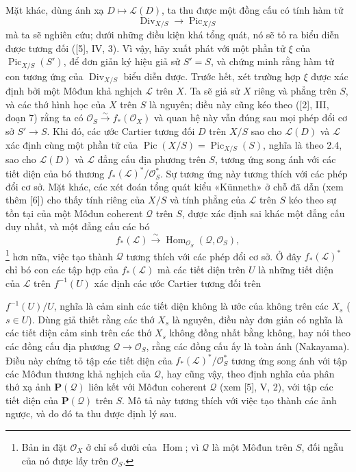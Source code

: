 \documentclass[11pt,twoside,openany]{book}
\numberwithin{equation}{section}
\newcommand{\src}[1]{%
  \phantomsection\hypertarget{src:\fgasourceid:#1}{}%
  \marginpar{\raggedleft\footnotesize\sffamily #1}%
}
\newcommand{\fgasourceid}{unset}
\begin{document}
Mặt khác, dùng ánh xạ $D\longmapsto\mathcal L(D)$, ta thu được một đồng cấu có
tính hàm tử
\begin{equation}
\operatorname{Div}_{X/S}\longrightarrow\operatorname{Pic}_{X/S}
\tag{+}
\end{equation}
mà ta sẽ nghiên cứu; dưới những điều kiện khá tổng quát, nó sẽ tỏ ra biểu diễn
được tương đối ([5], IV, 3). Vì vậy, hãy xuất phát với một phần tử $\xi$ của
$\operatorname{Pic}_{X/S}(S')$, để đơn giản ký hiệu giả sử $S'=S$, và chứng
minh rằng hàm tử con tương ứng của $\operatorname{Div}_{X/S}$ biểu diễn được.
Trước hết, xét trường hợp $\xi$ được xác định bởi một Môđun khả nghịch
$\mathcal L$ trên $X$. Ta sẽ giả sử $X$ riêng và phẳng trên $S$, và các thớ
hình học của $X$ trên $S$ là nguyên; điều này cũng kéo theo ([2], III, đoạn 7)
rằng ta có $\mathcal O_S\xrightarrow{\sim}f_*(\mathcal O_X)$ và quan hệ này
vẫn đúng sau mọi phép đổi cơ sở $S'\longrightarrow S$. Khi đó, các ước Cartier
tương đối $D$ trên $X/S$ sao cho $\mathcal L(D)$ và $\mathcal L$ xác định cùng
một phần tử của $\operatorname{Pic}(X/S)=\operatorname{Pic}_{X/S}(S)$, nghĩa
là theo 2.4, sao cho $\mathcal L(D)$ và $\mathcal L$ đẳng cấu địa phương trên
$S$, tương ứng song ánh với các tiết diện của bó thương
$f_*(\mathcal L)^*/\mathcal O_S^*$. Sự tương ứng này tương thích với các phép
đổi cơ sở. Mặt khác, các xét đoán tổng quát kiểu «Künneth» ở chỗ đã dẫn (xem
thêm [6]) cho thấy tính riêng của $X/S$ và tính phẳng của $\mathcal L$ trên
$S$ kéo theo sự tồn tại của một Môđun coherent $\mathcal Q$ trên $S$, được
xác định sai khác một đẳng cấu duy nhất, và một đẳng cấu các bó
\[
f_*(\mathcal L)\xrightarrow{\sim}
\operatorname{Hom}_{\mathcal O_S}(\mathcal Q,\mathcal O_S),
\]
\footnote{Bản in đặt $\mathcal O_X$ ở chỉ số dưới của
$\operatorname{Hom}$; vì $\mathcal Q$ là một Môđun trên $S$, đối ngẫu của nó
được lấy trên $\mathcal O_S$.} hơn nữa, việc tạo thành $\mathcal Q$ tương
thích với các phép đổi cơ sở. Ở đây $f_*(\mathcal L)^*$ chỉ bó con các tập hợp
của $f_*(\mathcal L)$ mà các tiết diện trên $U$ là những tiết diện của
$\mathcal L$ trên $f^{-1}(U)$ xác định các ước Cartier tương đối trên
\src{153}
$f^{-1}(U)/U$, nghĩa là cảm sinh các tiết diện không là ước của không trên các
$X_s$ ($s\in U$). Dùng giả thiết rằng các thớ $X_s$ là nguyên, điều này đơn
giản có nghĩa là các tiết diện cảm sinh trên các thớ $X_s$ không đồng nhất
bằng không, hay nói theo các đồng cấu địa phương
$\mathcal Q\longrightarrow\mathcal O_S$, rằng các đồng cấu ấy là toàn ánh
(Nakayama). Điều này chứng tỏ tập các tiết diện của
$f_*(\mathcal L)^*/\mathcal O_S^*$ tương ứng song ánh với tập các Môđun thương
khả nghịch của $\mathcal Q$, hay cũng vậy, theo định nghĩa của phân thớ xạ ảnh
$\mathbf P(\mathcal Q)$ liên kết với Môđun coherent $\mathcal Q$ (xem [5], V,
2), với tập các tiết diện của $\mathbf P(\mathcal Q)$ trên $S$. Mô tả này
tương thích với việc tạo thành các ảnh ngược, và do đó ta thu được định lý sau.
\end{document}
